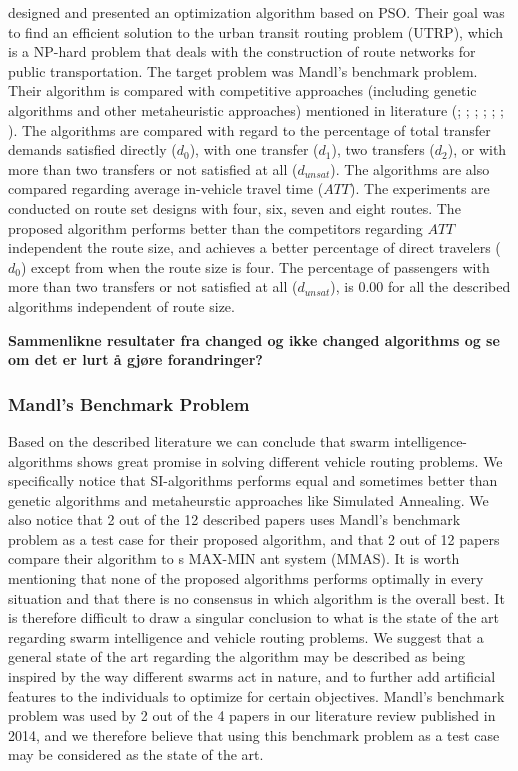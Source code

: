 \citet{kechagiopoulos14} designed and presented an optimization algorithm based on PSO. Their goal was to find an efficient solution to the urban transit routing problem (UTRP), which is a NP-hard problem that deals with the construction of route networks for public transportation. The target problem was Mandl's benchmark problem. Their algorithm is compared with competitive approaches (including genetic algorithms and other metaheuristic approaches) mentioned in literature (\citet{baaj91}; \citet{chakroborty02}; \citet{kidwai98}; \citet{fan10}; \citet{fan09-2}; \citet{zhang10}; \citet{chew12}). The algorithms are compared with regard to the percentage of total transfer demands satisfied directly ($d_0$), with one transfer ($d_1$), two transfers ($d_2$), or with more than two transfers or not satisfied at all ($d_{unsat}$). The algorithms are also compared regarding average in-vehicle travel time ($ATT$). The experiments are conducted on route set designs with four, six, seven and eight routes. The proposed algorithm performs better than the competitors regarding $ATT$ independent the route size, and achieves a better percentage of direct travelers ($d_0$) except from when the route size is four. The percentage of passengers with more than two transfers or not satisfied at all ($d_{unsat}$), is $0.00$ for all the described algorithms independent of route size.

\textbf{Sammenlikne resultater fra changed og ikke changed algorithms og se om det er lurt å gjøre forandringer?}
\subsubsection{Mandl's Benchmark Problem}


Based on the described literature we can conclude that swarm intelligence-algorithms shows great promise in solving different vehicle routing problems. We specifically notice that SI-algorithms performs equal and sometimes better than genetic algorithms and  metaheurstic approaches like Simulated Annealing. We also notice that 2 out of the 12 described papers uses Mandl's benchmark problem as a test case for their proposed algorithm, and that 2 out of 12 papers compare their algorithm to \citet{stutzle99}s MAX-MIN ant system (MMAS). It is worth mentioning that none of the proposed algorithms performs optimally in every situation and that there is no consensus in which algorithm is the overall best. It is therefore difficult to draw a singular conclusion to what is the state of the art regarding swarm intelligence and vehicle routing problems. We suggest that a general state of the art regarding the algorithm may be described as being inspired by the way different swarms act in nature, and to further add artificial features to the individuals to optimize for certain objectives. Mandl's benchmark problem was used by 2 out of the 4 papers in our literature review published in 2014, and we therefore believe that using this benchmark problem as a test case may be considered as the state of the art.

